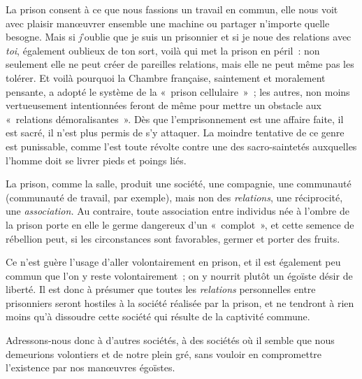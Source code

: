 \documentclass[french,twoside]{book} %
\begin{document}
La prison consent à ce que nous fassions un travail en commun, elle nous voit avec plaisir manœuvrer ensemble une machine ou partager n’importe quelle besogne. Mais si \emph{j}’oublie que je suis un prisonnier et si je noue des relations avec \emph{toi}, également oublieux de ton sort, voilà qui met la prison en péril : non seulement elle ne peut créer de pareilles relations, mais elle ne peut même pas les tolérer. Et voilà pourquoi la Chambre française, saintement et moralement pensante, a adopté le système de la « prison cellulaire » ; les autres, non moins vertueusement intentionnées feront de même pour mettre un obstacle aux « relations démoralisantes ». Dès que l’emprisonnement est une affaire faite, il est sacré, il n’est plus permis de s’y attaquer. La moindre tentative de ce genre est punissable, comme l’est toute révolte contre une des sacro-saintetés auxquelles l’homme doit se livrer pieds et poings liés.\par
La prison, comme la salle, produit une société, une compagnie, une communauté (communauté de travail, par exemple), mais non des \emph{relations}, une réciprocité, une \emph{association.} Au contraire, toute association entre individus née à l’ombre de la prison porte en elle le germe dangereux d’un « complot », et cette semence de rébellion peut, si les circonstances sont favorables, germer et porter des fruits.\par
Ce n’est guère l’usage d’aller volontairement en  prison, et il est également peu commun que l’on y reste volontairement ; on y nourrit plutôt un égoïste désir de liberté. Il est donc à présumer que toutes les \emph{relations} personnelles entre prisonniers seront hostiles à la société réalisée par la prison, et ne tendront à rien moins qu’à dissoudre cette société qui résulte de la captivité commune.\par
Adressons-nous donc à d’autres sociétés, à des sociétés où il semble que nous demeurions volontiers et de notre plein gré, sans vouloir en compromettre l’existence par nos manœuvres égoïstes.\par
\end{document}
